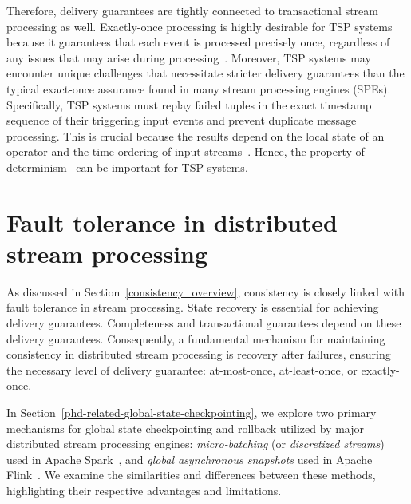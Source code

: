 Therefore, delivery guarantees are tightly connected to transactional stream processing as well. Exactly-once processing is highly desirable for TSP systems because it guarantees that each event is processed precisely once, regardless of any issues that may arise during processing~\cite{zhang2024survey}. Moreover, TSP systems may encounter unique challenges that necessitate stricter delivery guarantees than the typical exact-once assurance found in many stream processing engines (SPEs). Specifically, TSP systems must replay failed tuples in the exact timestamp sequence of their triggering input events and prevent duplicate message processing. This is crucial because the results depend on the local state of an operator and the time ordering of input streams~\cite{zhang2024survey}. Hence, the property of determinism~\cite{thepaper, Zacheilas:2017:MDS:3093742.3093921, palyvos2022research} can be important for TSP systems.


\section{Fault tolerance in distributed stream processing}
\label{phd-related-fault-tolerance}

As discussed in Section~\ref{consistency_overview}, consistency is closely linked with fault tolerance in stream processing. State recovery is essential for achieving delivery guarantees. Completeness and transactional guarantees depend on these delivery guarantees. Consequently, a fundamental mechanism for maintaining consistency in distributed stream processing is recovery after failures, ensuring the necessary level of delivery guarantee: at-most-once, at-least-once, or exactly-once.

In Section~\ref{phd-related-global-state-checkpointing}, we explore two primary mechanisms for global state checkpointing and rollback utilized by major distributed stream processing engines: {\em micro-batching} (or {\em discretized streams}) used in Apache Spark~\cite{Zaharia:2012:DSE:2342763.2342773}, and {\em global asynchronous snapshots} used in Apache Flink~\cite{2015arXiv150608603C, Carbone:2017:SMA:3137765.3137777}. We examine the similarities and differences between these methods, highlighting their respective advantages and limitations.

